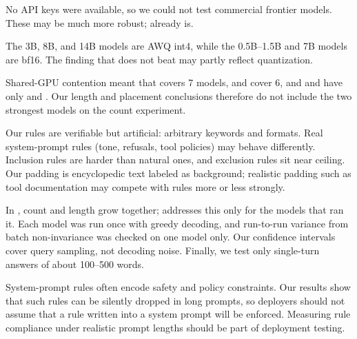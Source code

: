 No API keys were available, so we could not test commercial frontier models.
These may be much more robust; \qwenthree already is.

The 3B, 8B, and 14B models are AWQ int4, while the 0.5B--1.5B and 7B models are bf16.
The finding that \qfourteen does not beat \qseven may partly reflect quantization.

Shared-GPU contention meant that \expB covers 7 models, \expE and \expF cover 6, and \qwenthree and \qfourteen have only \expA and \expD.
Our length and placement conclusions therefore do not include the two strongest models on the count experiment.

Our rules are verifiable but artificial: arbitrary keywords and formats.
Real system-prompt rules (tone, refusals, tool policies) may behave differently.
Inclusion rules are harder than natural ones, and exclusion rules sit near ceiling.
Our padding is encyclopedic text labeled as background; realistic padding such as tool documentation may compete with rules more or less strongly.

In \expA, count and length grow together; \expE addresses this only for the models that ran it.
Each model was run once with greedy decoding, and run-to-run variance from batch non-invariance was checked on one model only.
Our confidence intervals cover query sampling, not decoding noise.
Finally, we test only single-turn answers of about 100--500 words.

System-prompt rules often encode safety and policy constraints.
Our results show that such rules can be silently dropped in long prompts, so deployers should not assume that a rule written into a system prompt will be enforced.
Measuring rule compliance under realistic prompt lengths should be part of deployment testing.
